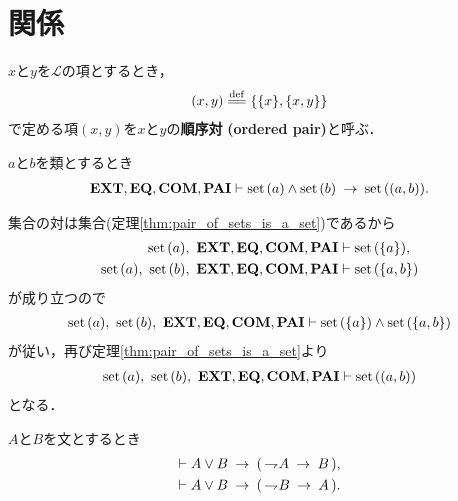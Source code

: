 \section{関係}
	\begin{screen}
		\begin{dfn}[順序対]
			$x$と$y$を$\mathcal{L}$の項とするとき，
			\begin{align}
				(x,y) \defeq \{\{x\},\{x,y\}\}
			\end{align}
			で定める項$(x,y)$を$x$と$y$の{\bf 順序対}
			{\bf (ordered pair)}と呼ぶ．
		\end{dfn}
	\end{screen}
	
	\begin{screen}
		\begin{thm}[集合の順序対は集合]
		\label{thm:ordered_pair_of_sets_is_a_set}
			$a$と$b$を類とするとき
			\begin{align}
				\EXTAX,\EQAX,\COMAX,\PAIAX \vdash
				\set{a} \wedge \set{b} \rarrow \set{(a,b)}.
			\end{align}
		\end{thm}
	\end{screen}
	
	\begin{prf}
		集合の対は集合(定理\ref{thm:pair_of_sets_is_a_set})であるから
		\begin{align}
			\set{a},\ \EXTAX,\EQAX,\COMAX,\PAIAX &\vdash \set{\{a\}}, \\
			\set{a},\ \set{b},\ \EXTAX,\EQAX,\COMAX,\PAIAX &\vdash \set{\{a,b\}}
		\end{align}
		が成り立つので
		\begin{align}
			\set{a},\ \set{b},\ \EXTAX,\EQAX,\COMAX,\PAIAX \vdash 
			\set{\{a\}} \wedge \set{\{a,b\}}
		\end{align}
		が従い，再び定理\ref{thm:pair_of_sets_is_a_set}より
		\begin{align}
			\set{a},\ \set{b},\ \EXTAX,\EQAX,\COMAX,\PAIAX \vdash \set{(a,b)}
		\end{align}
		となる．
		\QED
	\end{prf}
	
	\begin{screen}
		\begin{logicalthm}[選言三段論法]
		\label{logicalthm:disjunctive_syllogism}
			$A$と$B$を文とするとき
			\begin{align}
				\vdash A \vee B \rarrow (\, \negation A \rarrow B\, ), \\
				\vdash A \vee B \rarrow (\, \negation B \rarrow A\, ).
			\end{align}
		\end{logicalthm}
	\end{screen}
	
